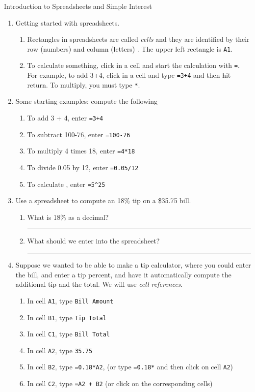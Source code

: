 \documentclass[12pt]{article}
\newcommand{\ans}[1][1in]{\rule{#1}{.5pt}}
\newcommand{\be}{\begin{enumerate}}
\newcommand{\ee}{\end{enumerate}}
\begin{document}
\begin{center}
{\Large  Introduction to Spreadsheets and Simple Interest}
\end{center}
\begin{enumerate}

\item Getting started with spreadsheets. 
\be
\item Rectangles in spreadsheets are called \emph{cells} and they are identified by their row (numbers)  and column (letters) . The upper left rectangle is \verb`A1`.
\item To calculate something, click in a cell and start the calculation with \verb`=`. For example, to add 3+4, click in a cell and type \verb`=3+4` and then hit return. To multiply, you must type \verb`*`.
\ee

\item Some starting examples: compute the following
\be
\item To add 3 + 4, enter \verb`=3+4`
\item To subtract 100-76, enter \verb`=100-76`
\item To multiply 4 times 18, enter \verb`=4*18`
\item To divide 0.05 by 12, enter \verb`=0.05/12`
\item To calculate , enter \verb`=5^25`
\ee

\item Use a spreadsheet to compute an 18\% tip on a \$35.75 bill. 
\be
\item What is 18\% as a decimal? \ans
\item What should we enter into the spreadsheet? \ans
\ee

\item Suppose we wanted to be able to make a tip calculator, where you could enter the bill, and enter a tip percent, and have it automatically compute the additional tip and the total. We will use \emph{cell references}.

\be
\item In cell \verb`A1`, type \verb`Bill Amount`
\item In cell \verb`B1`, type \verb`Tip Total`
\item In cell \verb`C1`, type \verb`Bill Total`
\item In cell \verb`A2`, type \verb`35.75`
\item In cell \verb`B2`, type \verb`=0.18*A2`, (or type \verb`=0.18*` and then click on  cell \verb`A2`)
\item In cell \verb`C2`, type \verb`=A2 + B2` (or click on the corresponding cells)
\ee


\end{enumerate}
\end{document}

